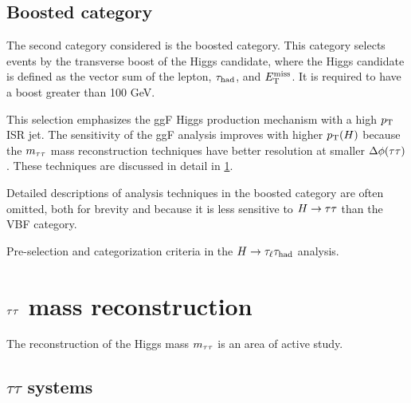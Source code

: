 \subsection{Boosted category}
\label{sec:strategy-boost}

The second category considered is the boosted category. This category selects events by the transverse boost of the Higgs candidate, where the Higgs candidate is defined as the vector sum of the lepton, $\tau_\text{had}$, and $E_{\mathrm{T}}^{\mathrm{miss}}$. It is required to have a boost greater than 100 GeV.

This selection emphasizes the ggF Higgs production mechanism with a high $p_{\mathrm{T}}$ ISR jet. The sensitivity of the ggF analysis improves with higher $p_{\mathrm{T}}(H)$ because the $m_{\tau\tau}$ mass reconstruction techniques have better resolution at smaller $\Delta\phi(\tau\tau)$. These techniques are discussed in detail in \cref{sec:strategy-mtautau}.

Detailed descriptions of analysis techniques in the boosted category are often omitted, both for brevity and because it is less sensitive to $H\rightarrow\tau\tau$ than the VBF category.

\begin{table}[bp]
  \centering
  \renewcommand{\arraystretch}{1.4}
  \caption{Pre-selection and categorization criteria in the $H\rightarrow\tau_\ell\tau_\text{had}$ analysis.}
  
  \label{tab:strategy-selection}
\end{table}

\clearpage

\section{$\tau\tau$ mass reconstruction}
\label{sec:strategy-mtautau}

The reconstruction of the Higgs mass $m_{\tau\tau}$ is an area of active study.

\subsection{$\tau\tau$ systems}
\label{sec:strategy-mtautau-intro}

